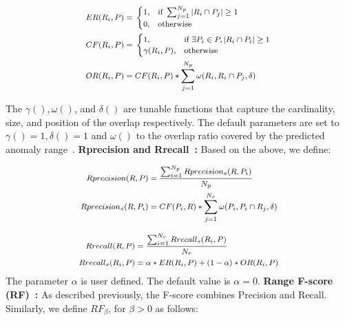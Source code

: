 \begin{equation}
\footnotesize{
\begin{split}
&ER(R_i,P) = \left.
\begin{cases}
1, &\text{if } \sum_{j=1}^{N_p} |R_i \cap P_j| \geq 1\\
0, &\text{otherwise}
\end{cases}
\right. \\
&CF(R_i,P) = \left.
\begin{cases}
1, &\text{if } \exists P_i \in P, |R_i \cap P_i| \geq 1\\
\gamma(R_i,P), &\text{otherwise}
\end{cases}
\right. \\
&OR(R_i,P) = CF(R_i,P)*\sum_{j=1}^{N_p} \omega(R_i,R_i \cap P_j, \delta)
\end{split}
}
\end{equation}

\noindent The $\gamma(),\omega()$, and $\delta()$ are tunable functions that capture the cardinality, size, and position of the overlap respectively.
The default parameters are set to $\gamma()=1,\delta()=1$ and $\omega()$ to the overlap ratio covered by the predicted anomaly range~\cite{tatbul_precision_2018}.
\newline \textbf{Rprecision and Rrecall~\cite{tatbul_precision_2018}: } Based on the above, we define:

\begin{equation}
\footnotesize{
\begin{split}
Rprecision(R,P) &= \frac{\sum_{i=1}^{N_p} Rprecision_s(R,P_i)}{N_p}\\
Rprecision_s(R,P_i) &= CF(P_i,R)*\sum_{j=1}^{N_r} \omega(P_i,P_i \cap R_j, \delta)
\end{split}
}
\end{equation}

\begin{equation}
\footnotesize{
\begin{split}
Rrecall(R,P) &= \frac{\sum_{i=1}^{N_r} Rrecall_s(R_i,P)}{N_r} \\
Rrecall_s(R_i,P) &= \alpha*ER(R_i,P) + (1-\alpha)*OR(R_i,P)
\end{split}
}
\end{equation}
\noindent The parameter $\alpha$ is user defined. The default value is $\alpha=0$.
\newline \textbf{Range F-score (RF)~\cite{tatbul_precision_2018}: } As described previously, the F-score combines Precision and Recall. Similarly, we define $RF_{\beta}$, for $\beta>0$ as follows:

